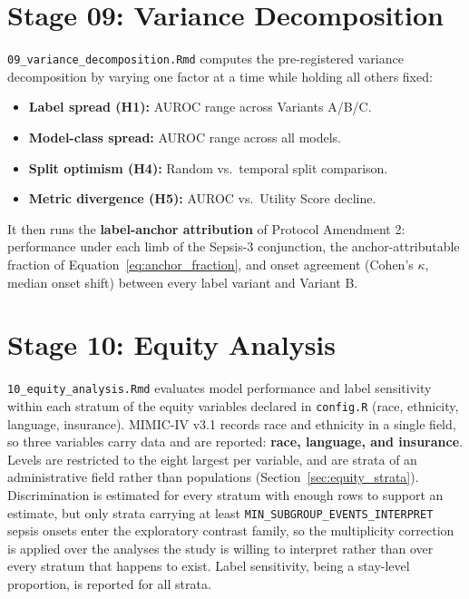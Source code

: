 \section{Stage 09: Variance Decomposition}

\texttt{09\_variance\_decomposition.Rmd} computes the pre-registered variance
decomposition by varying one factor at a time while holding all others fixed:

\begin{itemize}
    \item \textbf{Label spread (H1):} AUROC range across Variants A/B/C.
    \item \textbf{Model-class spread:} AUROC range across all models.
    \item \textbf{Split optimism (H4):} Random vs.\ temporal split comparison.
    \item \textbf{Metric divergence (H5):} AUROC vs.\ Utility Score decline.
\end{itemize}

It then runs the \textbf{label-anchor attribution} of Protocol Amendment 2:
performance under each limb of the Sepsis-3 conjunction, the
anchor-attributable fraction of Equation~\ref{eq:anchor_fraction}, and onset
agreement (Cohen's $\kappa$, median onset shift) between every label variant
and Variant B.


\section{Stage 10: Equity Analysis}

\texttt{10\_equity\_analysis.Rmd} evaluates model performance and label
sensitivity within each stratum of the equity variables declared in
\texttt{config.R} (race, ethnicity, language, insurance). MIMIC-IV v3.1 records
race and ethnicity in a single field, so three variables carry data and are
reported: \textbf{race, language, and insurance}. Levels are restricted to the
eight largest per variable, and are strata of an administrative field rather
than populations (Section~\ref{sec:equity_strata}). Discrimination is estimated
for every stratum with enough rows to support an estimate, but only strata
carrying at least \texttt{MIN\_SUBGROUP\_EVENTS\_INTERPRET} sepsis onsets enter
the exploratory contrast family, so the multiplicity correction is applied over
the analyses the study is willing to interpret rather than over every stratum
that happens to exist. Label sensitivity, being a stay-level proportion, is
reported for all strata.


